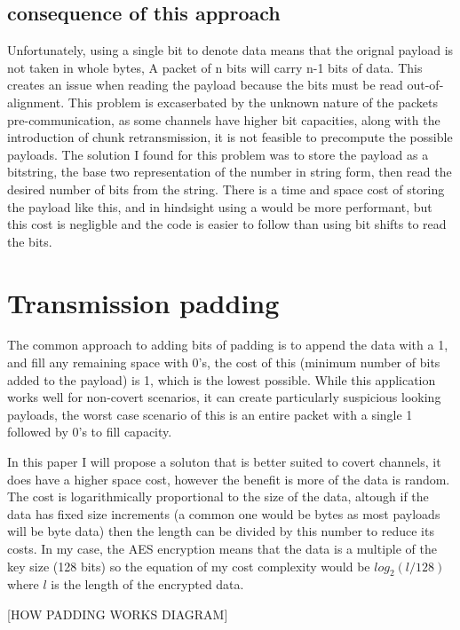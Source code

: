 \subsection{consequence of this approach}

Unfortunately, using a single bit to denote data means that the orignal payload is not taken in whole bytes, A packet of n bits will carry n-1 bits of data. This creates an issue when reading the payload because the bits must be read out-of-alignment. This problem is excaserbated by the unknown nature of the packets pre-communication, as some channels have higher bit capacities, along with the introduction of chunk retransmission, it is not feasible to precompute the possible payloads. The solution I found for this problem was to store the payload as a bitstring, the base two representation of the number in string form, then read the desired number of bits from the string. There is a time and space cost of storing the payload like this, and in hindsight using a  would be more performant, but this cost is negligble and the code is easier to follow than using bit shifts to read the bits.

\section{Transmission padding}

The common approach to adding bits of padding is to append the data with a 1, and fill any remaining space with 0's, the cost of this (minimum number of bits added to the payload) is 1, which is the lowest possible. While this application works well for non-covert scenarios, it can create particularly suspicious looking payloads, the worst case scenario of this is an entire packet with a single 1 followed by 0's to fill capacity.

In this paper I will propose a soluton that is better suited to covert channels, it does have a higher space cost, however the benefit is more of the data is random. The cost is logarithmically proportional to the size of the data, altough if the data has fixed size increments (a common one would be bytes as most payloads will be byte data) then the length can be divided by this number to reduce its costs. In my case, the AES encryption means that the data is a multiple of the key size (128 bits) so the equation of my cost complexity would be $log_2(l/128)$ where $l$ is the length of the encrypted data.

[HOW PADDING WORKS DIAGRAM]

